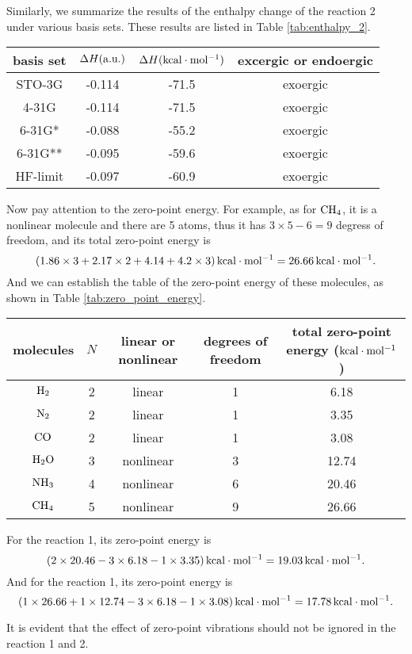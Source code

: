 \documentclass[a4paper]{book}
\newcounter{solution}[chapter]
\newcommand{\au}{{\rm a.u.}}
\newcommand\Tableref[1]{Table \ref{#1}}
\begin{document}
\begin{solution}
	Similarly, we summarize the results of the enthalpy change of the reaction 2 under various basis sets. These results are listed in \Tableref{tab:enthalpy_2}.
	\vspace{-1em}
	\begin{center}
	\label{tab:enthalpy_2}
	\begin{tabular}{c|c|c|c} \hline
	basis set & $\Delta H (\au)$ & $\Delta H ({\rm kcal\cdot mol^{-1}})$ & excergic or endoergic \\ \hline
	STO-3G 		& -0.114	& -71.5 & exoergic \\
	4-31G 		& -0.114 	& -71.5 & exoergic \\
	6-31G* 		& -0.088	& -55.2 & exoergic \\
	6-31G** 	& -0.095	& -59.6 & exoergic \\
	HF-limit 	& -0.097	& -60.9 & exoergic \\ \hline
	\end{tabular}
	\end{center}
	
	Now pay attention to the zero-point energy. For example, as for $\ce{CH4}$, it is a nonlinear molecule and there are 5 atoms, thus it has $3\times5-6=9$ degress of freedom, and its total zero-point energy is
	\[
		( 1.86 \times 3 + 2.17 \times 2 + 4.14 + 4.2 \times 3 ) \, {\rm kcal \cdot mol^{-1}} = 26.66 \, {\rm kcal \cdot mol^{-1}}.
	\]
	And we can establish the table of the zero-point energy of these molecules, as shown in \Tableref{tab:zero_point_energy}.
	\vspace{-1em}
	\begin{center}
	\label{tab:zero_point_energy}
	\begin{tabular}{c|c|c|c|c}\hline
	molecules & $N$ & linear or nonlinear & degrees of freedom & total zero-point energy (${\rm kcal \cdot mol^{-1}}$) \\ \hline
	$\ce{H2}$ & 2 & linear & 1 & 6.18 \\
	$\ce{N2}$ & 2 & linear & 1 & 3.35 \\
	$\ce{CO}$ & 2 & linear & 1 & 3.08 \\
	$\ce{H2O}$ & 3 & nonlinear & 3 & 12.74 \\
	$\ce{NH3}$ & 4 & nonlinear & 6 & 20.46 \\
	$\ce{CH4}$ & 5 & nonlinear & 9 & 26.66 \\ \hline
	\end{tabular}
	\end{center}
	
	For the reaction 1, its zero-point energy is
	\[
		( 2 \times 20.46 - 3 \times 6.18 - 1 \times 3.35 ) \, {\rm kcal \cdot mol^{-1}} = 19.03 \, {\rm kcal \cdot mol^{-1}} .
	\]
	And for the reaction 1, its zero-point energy is
	\[
		( 1 \times 26.66 + 1 \times 12.74 - 3 \times 6.18 - 1 \times 3.08 ) \, {\rm kcal \cdot mol^{-1}} = 17.78 \, {\rm kcal \cdot mol^{-1}} .
	\]
	
	It is evident that the effect of zero-point vibrations should not be ignored in the reaction 1 and 2.
	
	\end{solution}
	
\end{document}
